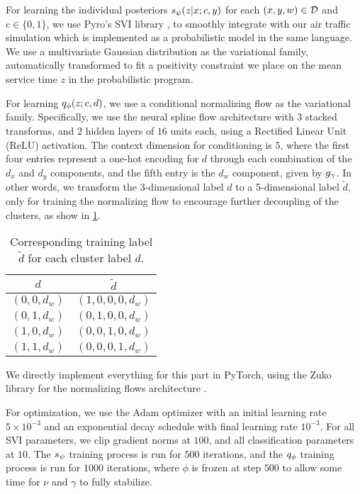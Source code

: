 For learning the individual posteriors $\svd{z\given x;c,y}$ for each $(x,y,w)\in\mathcal D$ and $c\in \{0,1\}$, we use Pyro's SVI library \cite{bingham2019pyro}, to smoothly integrate with our air traffic simulation which is implemented as a probabilistic model in the same language. We use a multivariate Gaussian distribution as the variational family, automatically transformed to fit a positivity constraint we place on the mean service time $z$ in the probabilistic program.

For learning $\qvd{z;c,d}$, we use a conditional normalizing flow as the variational family. Specifically, we use the neural spline flow architecture \cite{durkan2019neural} with $3$ stacked transforms, and $2$ hidden layers of $16$ units each, using a Rectified Linear Unit (ReLU) activation. The context dimension for conditioning is $5$, where the first four entries represent a one-hot encoding for $d$ through each combination of the $d_x$ and $d_y$ components, and the fifth entry is the $d_w$ component, given by $g_{\gamma}$. In other words, we transform the 3-dimensional label $d$ to a 5-dimensional label $\widetilde{d}$, only for training the normalizing flow to encourage further decoupling of the clusters, as show in \cref{tab:d-training-labels}.

\begin{table}[htb]
    \centering
    \begin{tabular}{c||c}
        $d$ & $\widetilde{d}$ \\
        \hline\hline
        $(0,0,d_w)$ & $(1,0,0,0,d_w)$ \\
        \hline
        $(0,1,d_w)$ & $(0,1,0,0,d_w)$ \\
        \hline
        $(1,0,d_w)$ & $(0,0,1,0,d_w)$ \\
        \hline
        $(1,1,d_w)$ & $(0,0,0,1,d_w)$ \\
    \end{tabular}
    \caption{Corresponding training label $\widetilde{d}$ for each cluster label $d$.}
    \label{tab:d-training-labels}
\end{table}

We directly implement everything for this part in PyTorch, using the Zuko library for the normalizing flows architecture \cite{rozet2024probabilists}.

For optimization, we use the Adam optimizer with an initial learning rate $5\times 10^{-3}$ and an exponential decay schedule with final learning rate $10^{-3}$. For all SVI parameters, we clip gradient norms at $100$, and all classification parameters at $10$. The $s_{\psi}$ training process is run for $500$ iterations, and the $q_{\phi}$ training process is run for $1000$ iterations, where $\phi$ is frozen at step $500$ to allow some time for $\nu$ and $\gamma$ to fully stabilize.
